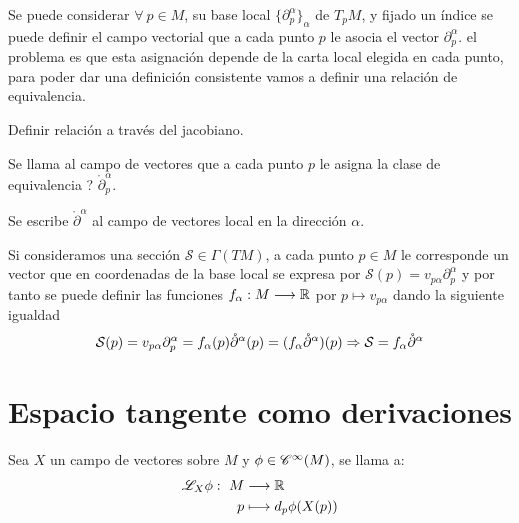 Se puede considerar $\forall\ p\in M$, su base local $\{\partial_p^\alpha\}_\alpha$ de $T_p M$, y fijado un índice
se puede definir el campo vectorial que a cada punto $p$ le asocia el vector $\partial_p^\alpha$. el problema es que
esta asignación depende de la carta local elegida en cada punto, para poder dar una definición consistente vamos a
definir una relación de equivalencia.

\begin{exercise}
  Definir relación a través del jacobiano.
\end{exercise}

\begin{definition}
  Se llama  al campo de
  vectores que a cada punto $p$ le asigna la clase de equivalencia ? $\mathring{\partial}_p^\alpha$.
\end{definition}
\begin{notation}
  Se escribe $\mathring{\partial}^\alpha$ al campo de vectores local en la dirección $\alpha$.
\end{notation}

Si consideramos una sección $\mathcal{S}\in\Gamma(TM)$, a cada punto $p\in M$ le corresponde un vector que en
coordenadas de la base local se expresa por $\mathcal{S}(p)=v_{p\alpha}\partial_p^\alpha$ y por tanto se puede definir
las funciones $f_\alpha:M\longrightarrow \mathbb{R}$ por $p\mapsto v_{p\alpha}$ dando la siguiente igualdad
\begin{equation}\label{eq:seccion-coordenadas-locales}
\mathcal{S}(p)=v_{p\alpha}\partial_p^\alpha=f_\alpha(p)\mathring{\partial}^\alpha(p)=(f_\alpha\mathring{\partial}^\alpha)(p)
  \Rightarrow
\mathcal{S}=f_\alpha\mathring{\partial}^\alpha
\end{equation}

\section{Espacio tangente como derivaciones}\label{sec:espacio-tangente-como-derivaciones}

\begin{definition}
  Sea $X$ un campo de vectores sobre $M$ y $\phi\in\mathscr{C}^\infty(M)$, se llama  a:
  \begin{equation}
    \label{eq:derivada-lie-funcion-campo}
    \begin{alignedat}{1}
      \mathscr{L}_X \phi:\ M & \longrightarrow \mathbb{R} \\ p & \longmapsto d_p \phi(X(p))
    \end{alignedat}
  \end{equation}
\end{definition}

